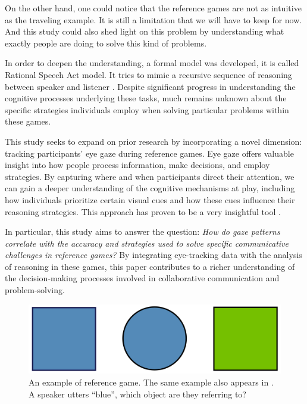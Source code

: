 On the other hand, one could notice that the reference games are not as intuitive as the traveling example. It is still a limitation that we will have to keep for now. And this study could also shed light on this problem by understanding what exactly people are doing to solve this kind of problems.

In order to deepen the understanding, a formal model was developed, it is called Rational Speech Act model. It tries to mimic a recursive sequence of reasoning between speaker and listener \citep{Franke_2016}. Despite significant progress in understanding the cognitive processes underlying these tasks, much remains unknown about the specific strategies individuals employ when solving particular problems within these games.

This study seeks to expand on prior research by incorporating a novel dimension: tracking participants' eye gaze during reference games. Eye gaze offers valuable insight into how people process information, make decisions, and employ strategies. By capturing where and when participants direct their attention, we can gain a deeper understanding of the cognitive mechanisms at play, including how individuals prioritize certain visual cues and how these cues influence their reasoning strategies. This approach has proven to be a very insightful tool \citep{Vigneau_2006}.

In particular, this study aims to answer the question: \textit{How do gaze patterns correlate with the accuracy and strategies used to solve specific communicative challenges in reference games?} By integrating eye-tracking data with the analysis of reasoning in these games, this paper contributes to a richer understanding of the decision-making processes involved in collaborative communication and problem-solving.

\begin{figure}
    \centering
    \includegraphics[width=0.6\linewidth]{images/intro_complex.png}
    \caption{An example of reference game. The same example also appears in \cite{Frank_2012}. A speaker utters ``blue'', which object are they referring to?}
    \label{fig:intro_complex}
\end{figure}